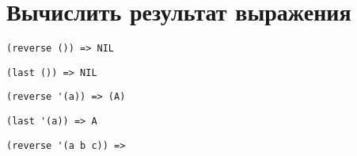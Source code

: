 
\section{Вычислить результат выражения}

\problem \hfill

\begin{lstlisting}
(reverse ()) => NIL
\end{lstlisting}


\problem \hfill

\begin{lstlisting}
(last ()) => NIL
\end{lstlisting}


\problem \hfill

\begin{lstlisting}
(reverse '(a)) => (A)
\end{lstlisting}


\problem \hfill

\begin{lstlisting}
(last '(a)) => A
\end{lstlisting}


\problem \hfill

\begin{lstlisting}
(reverse '(a b c)) => 
\end{lstlisting}